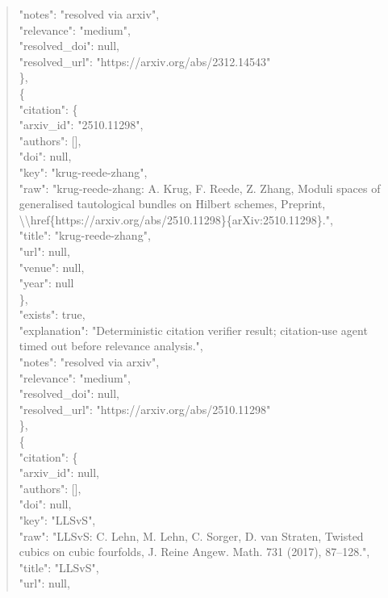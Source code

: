 \documentclass[11pt]{article}
\begin{document}
\begin{quote}
      "notes": "resolved via arxiv",\\
      "relevance": "medium",\\
      "resolved\_doi": null,\\
      "resolved\_url": "https://arxiv.org/abs/2312.14543"\\
    \},\\
    \{\\
      "citation": \{\\
        "arxiv\_id": "2510.11298",\\
        "authors": [],\\
        "doi": null,\\
        "key": "krug-reede-zhang",\\
        "raw": "krug-reede-zhang: A. Krug, F. Reede, Z. Zhang, Moduli spaces of generalised tautological bundles on Hilbert schemes, Preprint, \textbackslash{}\textbackslash{}href\{https://arxiv.org/abs/2510.11298\}\{arXiv:2510.11298\}.",\\
        "title": "krug-reede-zhang",\\
        "url": null,\\
        "venue": null,\\
        "year": null\\
      \},\\
      "exists": true,\\
      "explanation": "Deterministic citation verifier result; citation-use agent timed out before relevance analysis.",\\
      "notes": "resolved via arxiv",\\
      "relevance": "medium",\\
      "resolved\_doi": null,\\
      "resolved\_url": "https://arxiv.org/abs/2510.11298"\\
    \},\\
    \{\\
      "citation": \{\\
        "arxiv\_id": null,\\
        "authors": [],\\
        "doi": null,\\
        "key": "LLSvS",\\
        "raw": "LLSvS: C. Lehn, M. Lehn, C. Sorger, D. van Straten, Twisted cubics on cubic fourfolds, J. Reine Angew. Math. 731 (2017), 87--128.",\\
        "title": "LLSvS",\\
        "url": null,\\

\end{quote}
\end{document}

